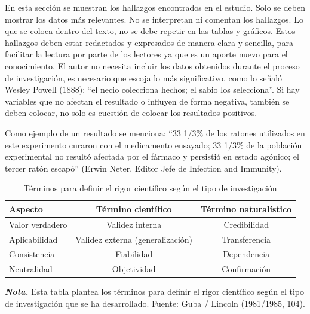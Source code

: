 \documentclass[12pt, a4paper, nofontenc, numbers=endperiod]{apa7}
\begin{document}
{\setlength{\parindent}{1.27cm}En esta sección se muestran los hallazgos encontrados en el estudio. Solo se deben mostrar los datos más relevantes. No se interpretan ni comentan los hallazgos. Lo que se coloca dentro del texto, no se debe repetir en las tablas y gráficos. Estos hallazgos deben estar redactados y expresados de manera clara y sencilla, para facilitar la lectura por parte de los lectores ya que es un aporte nuevo para el conocimiento. El autor no necesita incluir los datos obtenidos durante el proceso de investigación, es necesario que escoja lo más significativo, como lo señaló Wesley Powell (1888): “el necio colecciona hechos; el sabio los selecciona”. Si hay variables que no afectan el resultado o influyen de forma negativa, también se deben colocar, no solo es cuestión de colocar los resultados positivos. 

\setlength{\parindent}{1.27cm}Como ejemplo de un resultado se menciona: “33 1/3\% de los ratones utilizados en este experimento curaron con el medicamento ensayado; 33 1/3\% de la población experimental no resultó afectada por el fármaco y persistió en estado agónico; el tercer ratón escapó” (Erwin Neter, Editor Jefe de Infection and Immunity).
\newpage
	\begin{table}[h]
	{\renewcommand{\arraystretch}{0.7}	
		{\singlespacing
	\caption{Términos para definir el rigor científico según el tipo de investigación}
	\label{Tabla4} %
		\begin{tabular}{p{4.5cm}cp{4.75cm}}
			\toprule
			\centering Aspecto&Término científico&\hspace{0.5cm}Término naturalístico\\
			\midrule
			\centering Valor verdadero&Validez interna&  \multicolumn{1}{c}{Credibilidad}\\
			\centering Aplicabilidad&Validez externa (generalización)& \multicolumn{1}{c}{Transferencia}\\
			\centering Consistencia&Fiabilidad& \multicolumn{1}{c}{Dependencia}\\
			\centering Neutralidad&Objetividad & \multicolumn{1}{c}{Confirmación}\\
			\midrule
		\end{tabular}
		\begin{tablenotes}[para,flushleft]
			{\small
				\textit{\textbf{Nota.}} Esta tabla plantea los términos para definir el rigor científico según el tipo de investigación que se ha desarrollado. Fuente: Guba / Lincoln (1981/1985, 104).
			}
		\end{tablenotes}
	}
}
\end{table}


}
\end{document}

